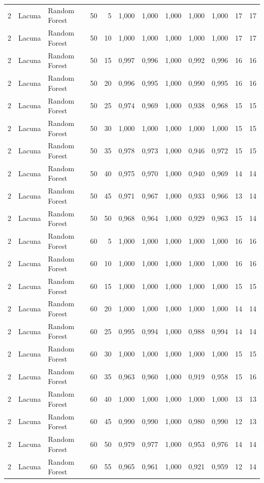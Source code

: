 \begin{longtable}{@{}rllrrrrrrrrr@{}}
2 & Lacuna & Random Forest & 50 & 5 & 1,000 & 1,000 & 1,000 & 1,000 & 1,000 & 17 & 17 \\
2 & Lacuna & Random Forest & 50 & 10 & 1,000 & 1,000 & 1,000 & 1,000 & 1,000 & 17 & 17 \\
2 & Lacuna & Random Forest & 50 & 15 & 0,997 & 0,996 & 1,000 & 0,992 & 0,996 & 16 & 16 \\
2 & Lacuna & Random Forest & 50 & 20 & 0,996 & 0,995 & 1,000 & 0,990 & 0,995 & 16 & 16 \\
2 & Lacuna & Random Forest & 50 & 25 & 0,974 & 0,969 & 1,000 & 0,938 & 0,968 & 15 & 15 \\
2 & Lacuna & Random Forest & 50 & 30 & 1,000 & 1,000 & 1,000 & 1,000 & 1,000 & 15 & 15 \\
2 & Lacuna & Random Forest & 50 & 35 & 0,978 & 0,973 & 1,000 & 0,946 & 0,972 & 15 & 15 \\
2 & Lacuna & Random Forest & 50 & 40 & 0,975 & 0,970 & 1,000 & 0,940 & 0,969 & 14 & 14 \\
2 & Lacuna & Random Forest & 50 & 45 & 0,971 & 0,967 & 1,000 & 0,933 & 0,966 & 13 & 14 \\
2 & Lacuna & Random Forest & 50 & 50 & 0,968 & 0,964 & 1,000 & 0,929 & 0,963 & 15 & 14 \\
2 & Lacuna & Random Forest & 60 & 5 & 1,000 & 1,000 & 1,000 & 1,000 & 1,000 & 16 & 16 \\
2 & Lacuna & Random Forest & 60 & 10 & 1,000 & 1,000 & 1,000 & 1,000 & 1,000 & 16 & 16 \\
2 & Lacuna & Random Forest & 60 & 15 & 1,000 & 1,000 & 1,000 & 1,000 & 1,000 & 15 & 15 \\
2 & Lacuna & Random Forest & 60 & 20 & 1,000 & 1,000 & 1,000 & 1,000 & 1,000 & 14 & 14 \\
2 & Lacuna & Random Forest & 60 & 25 & 0,995 & 0,994 & 1,000 & 0,988 & 0,994 & 14 & 14 \\
2 & Lacuna & Random Forest & 60 & 30 & 1,000 & 1,000 & 1,000 & 1,000 & 1,000 & 15 & 15 \\
2 & Lacuna & Random Forest & 60 & 35 & 0,963 & 0,960 & 1,000 & 0,919 & 0,958 & 15 & 16 \\
2 & Lacuna & Random Forest & 60 & 40 & 1,000 & 1,000 & 1,000 & 1,000 & 1,000 & 13 & 13 \\
2 & Lacuna & Random Forest & 60 & 45 & 0,990 & 0,990 & 1,000 & 0,980 & 0,990 & 12 & 13 \\
2 & Lacuna & Random Forest & 60 & 50 & 0,979 & 0,977 & 1,000 & 0,953 & 0,976 & 14 & 14 \\
2 & Lacuna & Random Forest & 60 & 55 & 0,965 & 0,961 & 1,000 & 0,921 & 0,959 & 12 & 14 \\

\end{longtable}
